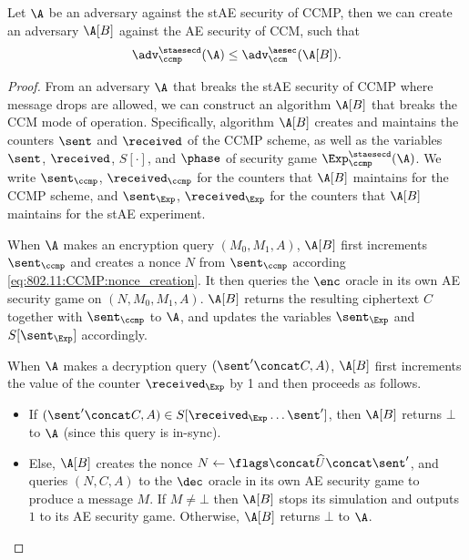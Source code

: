 \begin{theorem}
Let $\A$ be an adversary against the stAE security of CCMP,
then we can create an adversary $\A[B]$ against the AE security of CCM,
such that
\begin{equation}
	\adv_{\ccmp}^{\staesecd}(\A) \leq \adv_{\ccm}^{\aesec}(\A[B]) .
\end{equation}
\end{theorem}

\begin{proof}
From an adversary $\A$ that breaks the stAE security of CCMP where message drops are allowed,
we can construct an algorithm $\A[B]$ that breaks the CCM mode of operation.
Specifically,
algorithm $\A[B]$ creates and maintains the counters $\sent$ and $\received$ of the CCMP scheme,
as well as the variables $\sent$, $\received$, $S[\cdot]$, and $\phase$ of security game $\Exp_{\ccmp}^{\staesecd}(\A)$.
We write $\sent_\ccmp$, $\received_\ccmp$ for the counters that $\A[B]$ maintains for the CCMP scheme,
and $\sent_\Exp$, $\received_\Exp$ for the counters that $\A[B]$ maintains for the stAE experiment.


When $\A$ makes an encryption query $(M_0, M_1, A)$,
$\A[B]$ first increments $\sent_\ccmp$ and creates a nonce $N$ from $\sent_\ccmp$ according \cref{eq:802.11:CCMP:nonce_creation}.
It then queries the $\enc$ oracle in its own AE security game on $(N, M_0, M_1, A)$.
$\A[B]$ returns the resulting ciphertext $C$ together with $\sent_\ccmp$ to $\A$,
and updates the variables $\sent_\Exp$ and $S[\sent_\Exp]$ accordingly.

When $\A$ makes a decryption query $(\sent' \concat C, A)$,
$\A[B]$ first increments the value of the counter $\received_\Exp$ by 1 and then proceeds as follows.
\begin{itemize}
	\item If $(\sent' \concat C, A) \in S[\received_\Exp \dotso \sent']$,
	then $\A[B]$
	returns $\bot$ to $\A$
	(since this query is in-sync).
	
	
	\item Else,
	$\A[B]$ creates the nonce $N \gets \flags \concat \widehat{U} \concat \sent'$,
	and queries $(N, C, A)$ to the $\dec$ oracle in its own AE security game to produce a message $M$.
	If $M \neq \bot$ then $\A[B]$ stops its simulation and outputs $1$ to its AE security game.
	Otherwise,
	$\A[B]$ returns $\bot$ to $\A$. 
	

\end{itemize}
\end{proof}
